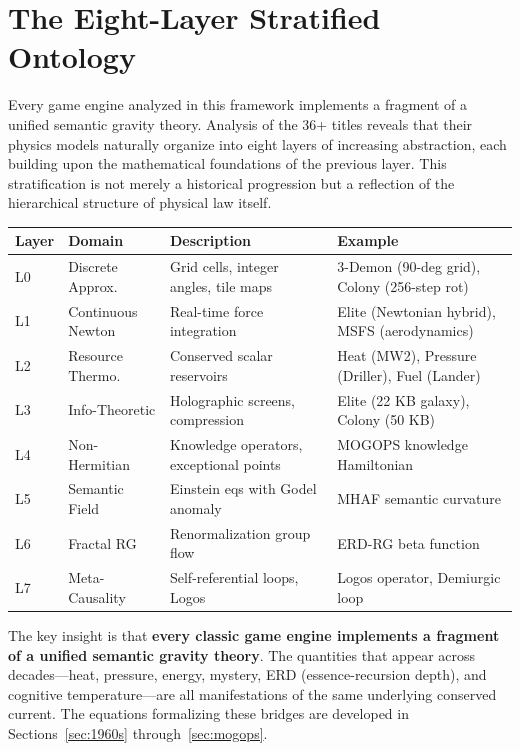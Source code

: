 \documentclass[11pt,a4paper]{article}
\theoremstyle{definition}
\begin{document}
\section{The Eight-Layer Stratified Ontology}\label{sec:layers}

Every game engine analyzed in this framework implements a fragment of a unified semantic gravity theory. Analysis of the 36+ titles reveals that their physics models naturally organize into eight layers of increasing abstraction, each building upon the mathematical foundations of the previous layer. This stratification is not merely a historical progression but a reflection of the hierarchical structure of physical law itself.

\begin{table}[htbp]
\centering
\footnotesize
\begin{tabular}{@{}p{0.8cm}p{2.2cm}p{5cm}p{4.5cm}@{}}
\toprule
\textbf{Layer} & \textbf{Domain} & \textbf{Description} & \textbf{Example} \\
\midrule
L0 & Discrete Approx. & Grid cells, integer angles, tile maps & 3-Demon (90-deg grid), Colony (256-step rot) \\
L1 & Continuous Newton & Real-time force integration & Elite (Newtonian hybrid), MSFS (aerodynamics) \\
L2 & Resource Thermo. & Conserved scalar reservoirs & Heat (MW2), Pressure (Driller), Fuel (Lander) \\
L3 & Info-Theoretic & Holographic screens, compression & Elite (22 KB galaxy), Colony (50 KB) \\
L4 & Non-Hermitian & Knowledge operators, exceptional points & MOGOPS knowledge Hamiltonian \\
L5 & Semantic Field & Einstein eqs with Godel anomaly & MHAF semantic curvature \\
L6 & Fractal RG & Renormalization group flow & ERD-RG beta function \\
L7 & Meta-Causality & Self-referential loops, Logos & Logos operator, Demiurgic loop \\
\bottomrule
\end{tabular}
\end{table}

The key insight is that \textbf{every classic game engine implements a fragment of a unified semantic gravity theory}. The quantities that appear across decades---heat, pressure, energy, mystery, ERD (essence-recursion depth), and cognitive temperature---are all manifestations of the same underlying conserved current. The equations formalizing these bridges are developed in Sections~\ref{sec:1960s} through~\ref{sec:mogops}.
\end{document}
